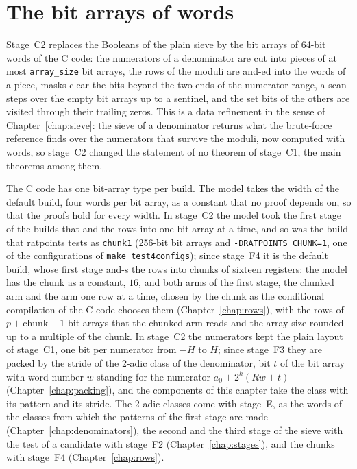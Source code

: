 \chapter{The bit arrays of words}\label{chap:words}

Stage~C2 replaces the Booleans of the plain sieve by the bit arrays of 64-bit words of the C code:
the numerators of a denominator are cut into pieces of at most \verb|array_size| bit arrays, the
rows of the moduli are and-ed into the words of a piece, masks clear the bits beyond the two ends of
the numerator range, a scan steps over the empty bit arrays up to a sentinel, and the set bits of
the others are visited through their trailing zeros. This is a data refinement in the sense of
Chapter~\ref{chap:sieve}: the sieve of a denominator returns what the brute-force reference finds
over the numerators that survive the moduli, now computed with words, so stage~C2 changed the
statement of no theorem of stage~C1, the main theorems among them.

The C code has one bit-array type per build. The model takes the width of the default build, four
words per bit array, as a constant that no proof depends on, so that the proofs hold for every
width. In stage~C2 the model took the first stage of the builds that and the rows into one bit array
at a time, and so was the build that ratpoints tests as \verb|chunk1| (256-bit bit arrays and
\verb|-DRATPOINTS_CHUNK=1|, one of the configurations of \verb|make test4configs|); since stage~F4
it is the default build, whose first stage and-s the rows into chunks of sixteen registers: the
model has the chunk as a constant, $16$, and both arms of the first stage, the chunked arm and the
arm one row at a time, chosen by the chunk as the conditional compilation of the C code chooses them
(Chapter~\ref{chap:rows}), with the rows of $p + \mathrm{chunk} - 1$ bit arrays that the chunked arm
reads and the array size rounded up to a multiple of the chunk. In stage~C2 the numerators kept the
plain layout of stage~C1, one bit per numerator from $-H$ to $H$; since stage~F3 they are packed by
the stride of the 2-adic class of the denominator, bit $t$ of the bit array with word number $w$
standing for the numerator $a_0 + 2^k (R w + t)$ (Chapter~\ref{chap:packing}), and the components of
this chapter take the class with its pattern and its stride. The 2-adic classes come with stage~E,
as the words of the classes from which the patterns of the first stage are made
(Chapter~\ref{chap:denominators}), the second and the third stage of the sieve with the test of a
candidate with stage~F2 (Chapter~\ref{chap:stages}), and the chunks with stage~F4
(Chapter~\ref{chap:rows}).

